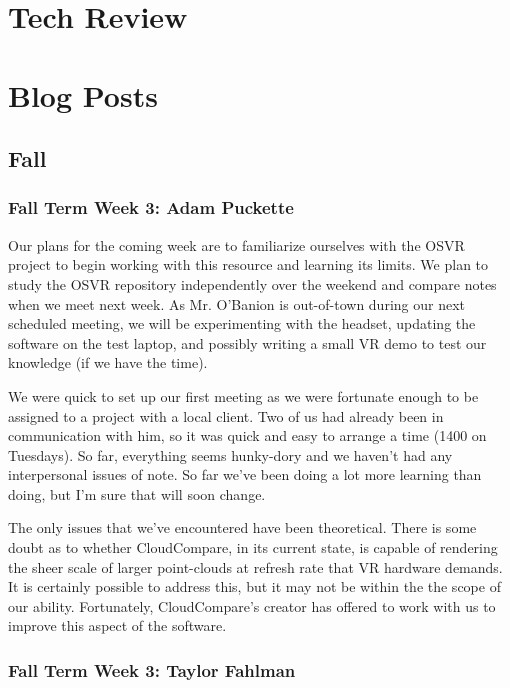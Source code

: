 \documentclass[draftclsnofoot,onecolumn]{IEEEtran}
\begin{document}
\section{Tech Review}




\section{Blog Posts}

\subsection{Fall}

\subsubsection{Fall Term Week 3: Adam Puckette}

Our plans for the coming week are to familiarize ourselves with the OSVR project to begin working with this resource and learning its limits. 
We plan to study the OSVR repository independently over the weekend and compare notes when we meet next week. 
As Mr. O'Banion is out-of-town during our next scheduled meeting, we will be experimenting with the headset, updating the software on the test laptop, and possibly writing a small VR demo to test our knowledge (if we have the time).

We were quick to set up our first meeting as we were fortunate enough to be assigned to a project with a local client. 
Two of us had already been in communication with him, so it was quick and easy to arrange a time (1400 on Tuesdays). 
So far, everything seems hunky-dory and we haven't had any interpersonal issues of note. 
So far we've been doing a lot more learning than doing, but I'm sure that will soon change.

The only issues that we've encountered have been theoretical. 
There is some doubt as to whether CloudCompare, in its current state, is capable of rendering the sheer scale of larger point-clouds at refresh rate that VR hardware demands. 
It is certainly possible to address this, but it may not be within the the scope of our ability. 
Fortunately, CloudCompare's creator has offered to work with us to improve this aspect of the software. 

\subsubsection{Fall Term Week 3: Taylor Fahlman}
\end{document}
